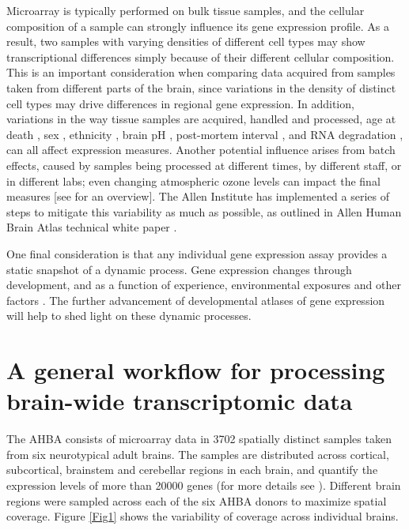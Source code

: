 \documentclass[10pt,A4]{article}
\begin{document}
Microarray is typically performed on bulk tissue samples, and the cellular composition of a sample can strongly influence its gene expression profile. As a result, two samples with varying densities of different cell types may show transcriptional differences simply because of their different cellular composition. This is an important consideration when comparing data acquired from samples taken from different parts of the brain, since variations in the density of distinct cell types may drive differences in regional gene expression. In addition, variations in the way tissue samples are acquired, handled and processed, age at death \citep{Glass2013}, sex \citep{Berchtold2008,Trabzuni2013}, ethnicity \citep{Spielman2007}, brain pH \citep{Mexal2006}, post-mortem interval \citep{Zhu2017}, and RNA degradation \citep{Jaksik2015}, can all affect expression measures. Another potential influence arises from batch effects, caused by samples being processed at different times, by different staff, or in different labs; even changing atmospheric ozone levels can impact the final measures \citep{Fare2003} [see \citet{Scherer2009} for an overview]. The Allen Institute has implemented a series of steps to mitigate this variability as much as possible, as outlined in Allen Human Brain Atlas technical white paper \citep{AHBAdoc}.

One final consideration is that any individual gene expression assay provides a static snapshot of a dynamic process. Gene expression changes through development, and as a function of experience, environmental exposures and other factors \citep{Fraser2005,Choi2007,Berchtold2008,Cole2009,Birdsill2011,Naumova2012,Kumar2013}.
The further advancement of developmental atlases of gene expression \citep{Johnson2009,Colantuoni2011,Kang2011,Fertuzinhos2014,Bakken2016} will help to shed light on these dynamic processes.

\section*{A general workflow for processing brain-wide transcriptomic data}
The AHBA consists of microarray data in \num{3702} spatially distinct samples taken from six neurotypical adult brains. The samples are distributed across cortical, subcortical, brainstem and cerebellar regions in each brain, and quantify the expression levels of more than \num{20000} genes (for more details see ). Different brain regions were sampled across each of the six AHBA donors to maximize spatial coverage. Figure \ref{Fig1} shows the  variability of coverage across individual brains.
\end{document}
